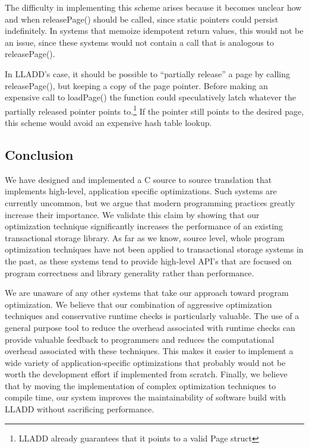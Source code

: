 \documentclass[10pt,letterpaper,twocolumn,english]{article}
\newcommand{\yad}{LLADD\xspace}
\newcommand{\pin}{loadPage()\xspace}
\newcommand{\unpin}{releasePage()\xspace}
\begin{document}
The difficulty in implementing this scheme arises because it becomes
unclear how and when \unpin should be called, since static pointers
could persist indefinitely.  In systems that
memoize idempotent return values, this would not be an issue, since
these systems would not contain a call that is analogous to \unpin.

In \yad's case, it should be possible to ``partially release'' a page by
calling \unpin, but keeping a copy of the page pointer.  Before making
an expensive call to \pin the function could speculatively latch
whatever the partially released pointer points
to.\footnote{\yad already guarantees that it points to a valid Page
struct} If the pointer still points to the desired page, this
scheme would avoid an expensive hash table lookup.

\subsection{Conclusion}

We have designed and implemented a C source to source translation that
implements high-level, application specific optimizations.  Such
systems are currently uncommon, but we argue that modern programming
practices greatly increase their importance.  We validate this claim
by showing that our optimization technique significantly increases the
performance of an existing transactional storage library.  As far as
we know, source level, whole program optimization techniques have not
been applied to transactional storage systems in the past, as these
systems tend to provide high-level API's that are focused on program 
correctness and library generality rather than performance.
 
We are unaware of any other
systems that take our approach toward program optimization.  We
believe that our combination of aggressive optimization techniques
and conservative runtime checks is particularly valuable.  The use of
a general purpose tool to reduce the overhead associated with runtime
checks can provide valuable feedback to programmers and reduces the 
computational overhead associated with these techniques.  This
makes it easier to implement a wide variety of application-specific
optimizations that probably would not be worth the
development effort if implemented from scratch.  Finally, we believe
that by moving the implementation of complex optimization techniques
to compile time, our system improves the maintainability of software
build with \yad without sacrificing performance.
\end{document}

